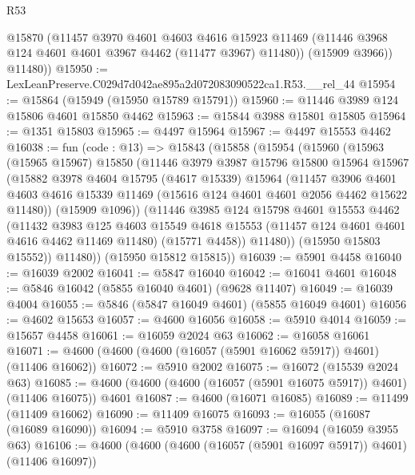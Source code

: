 \begin{lexlean}{R53}
\begin{coremodule}
          @15870
          (@11457
            @3970
            @4601
            @4603
            @4616
            @15923
            @11469
            (@11446 @3968 @124 @4601 @4601 @3967 @4462 (@11477 @3967) @11480))
          (@15909 @3966))
        @11480))
@15950 := LexLeanPreserve.C029d7d042ae895a2d072083090522ca1.R53.__rel_44
@15954 := @15864 (@15949 (@15950 @15789 @15791))
@15960 := @11446 @3989 @124 @15806 @4601 @15850 @4462
@15963 := @15844 @3988 @15801 @15805
@15964 := @1351 @15803
@15965 := @4497 @15964
@15967 := @4497 @15553 @4462
@16038 := fun (code : @13) =>
  @15843
    (@15858
      (@15954
        (@15960
          (@15963
            (@15965 @15967)
            @15850
            (@11446
              @3979
              @3987
              @15796
              @15800
              @15964
              @15967
              (@15882
                @3978
                @4604
                @15795
                (@4617 @15339)
                @15964
                (@11457
                  @3906
                  @4601
                  @4603
                  @4616
                  @15339
                  @11469
                  (@15616 @124 @4601 @4601 @2056 @4462 @15622 @11480))
                (@15909 @1096))
              (@11446
                @3985
                @124
                @15798
                @4601
                @15553
                @4462
                (@11432
                  @3983
                  @125
                  @4603
                  @15549
                  @4618
                  @15553
                  (@11457 @124 @4601 @4601 @4616 @4462 @11469 @11480)
                  (@15771 @4458))
                @11480))
            (@15950 @15803 @15552))
          @11480))
      (@15950 @15812 @15815))
@16039 := @5901 @4458
@16040 := @16039 @2002
@16041 := @5847 @16040
@16042 := @16041 @4601
@16048 := @5846 @16042 (@5855 @16040 @4601) (@9628 @11407)
@16049 := @16039 @4004
@16055 := @5846 (@5847 @16049 @4601) (@5855 @16049 @4601)
@16056 := @4602 @15653
@16057 := @4600 @16056
@16058 := @5910 @4014
@16059 := @15657 @4458
@16061 := @16059 @2024 @63
@16062 := @16058 @16061
@16071 := @4600 (@4600 (@4600 (@16057 (@5901 @16062 @5917)) @4601) (@11406 @16062))
@16072 := @5910 @2002
@16075 := @16072 (@15539 @2024 @63)
@16085 := @4600 (@4600 (@4600 (@16057 (@5901 @16075 @5917)) @4601) (@11406 @16075)) @4601
@16087 := @4600 (@16071 @16085)
@16089 := @11499 (@11409 @16062)
@16090 := @11409 @16075
@16093 := @16055 (@16087 (@16089 @16090))
@16094 := @5910 @3758
@16097 := @16094 (@16059 @3955 @63)
@16106 := @4600 (@4600 (@4600 (@16057 (@5901 @16097 @5917)) @4601) (@11406 @16097))

\end{coremodule}
\end{lexlean}
